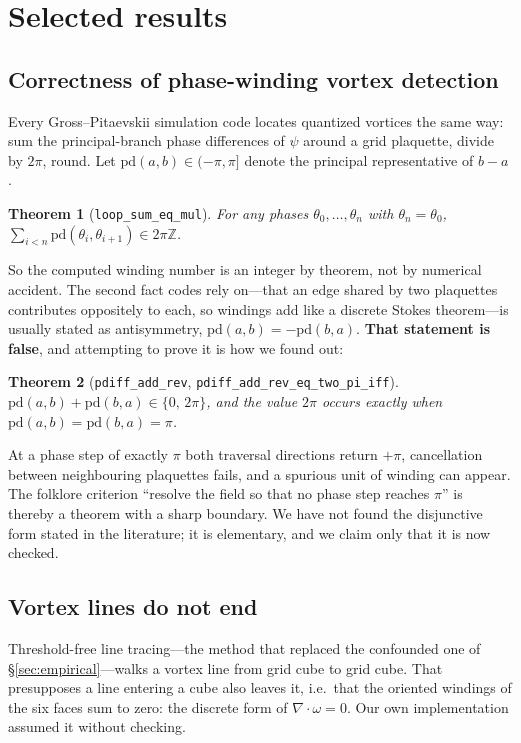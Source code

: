 \documentclass[11pt,a4paper]{article}
\newtheorem{theorem}{Theorem}
\theoremstyle{definition}
\newcommand{\lean}[1]{\texttt{\small #1}}
\begin{document}
\section{Selected results}

\subsection{Correctness of phase-winding vortex detection}
\label{sec:winding}

Every Gross--Pitaevskii simulation code locates quantized vortices the same way: sum the
principal-branch phase differences of $\psi$ around a grid plaquette, divide by $2\pi$,
round. Let $\mathrm{pd}(a,b)\in(-\pi,\pi]$ denote the principal representative of $b-a$.

\begin{theorem}[\lean{loop\_sum\_eq\_mul}]
For any phases $\theta_0,\dots,\theta_n$ with $\theta_n=\theta_0$,
$\sum_{i<n}\mathrm{pd}(\theta_i,\theta_{i+1}) \in 2\pi\mathbb{Z}$.
\end{theorem}
So the computed winding number is an integer by theorem, not by numerical accident. The
second fact codes rely on---that an edge shared by two plaquettes contributes oppositely to
each, so windings add like a discrete Stokes theorem---is usually stated as antisymmetry,
$\mathrm{pd}(a,b) = -\mathrm{pd}(b,a)$. \textbf{That statement is false}, and attempting to
prove it is how we found out:

\begin{theorem}[\lean{pdiff\_add\_rev}, \lean{pdiff\_add\_rev\_eq\_two\_pi\_iff}]
$\mathrm{pd}(a,b)+\mathrm{pd}(b,a)\in\{0,\,2\pi\}$, and the value $2\pi$ occurs exactly when
$\mathrm{pd}(a,b)=\mathrm{pd}(b,a)=\pi$.
\end{theorem}
At a phase step of exactly $\pi$ both traversal directions return $+\pi$, cancellation
between neighbouring plaquettes fails, and a spurious unit of winding can appear. The
folklore criterion ``resolve the field so that no phase step reaches $\pi$'' is thereby a
theorem with a sharp boundary. We have not found the disjunctive form stated in the
literature; it is elementary, and we claim only that it is now checked.

\subsection{Vortex lines do not end}
\label{sec:noend}

Threshold-free line tracing---the method that replaced the confounded one of
\S\ref{sec:empirical}---walks a vortex line from grid cube to grid cube. That presupposes a line
entering a cube also leaves it, i.e.\ that the oriented windings of the six faces sum to zero: the
discrete form of $\nabla\!\cdot\!\omega = 0$. Our own implementation assumed it without checking.
\end{document}
